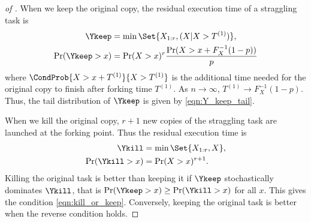 \begin{proof}[of ]
When we keep the original copy, the residual execution time of a straggling task is \begin{align}
\Ykeep &= \min\Set{X_{1:r}, (X | X > T^{(1)})}, \\
\Pr(\Ykeep > x) &= \Pr(X>x)^r \frac{\Pr(X > x + F_X^{-1}(1-p))}{p} \label{eqn:Y_keep_tail}
\end{align}
where $\CondProb{X > x + T^{(1)}}{X > T^{(1)}}$ is the additional time needed for the original copy to finish after forking time $T^{(1)}$. As $n \rightarrow \infty$, $T^{(1)} \rightarrow F_X^{-1}(1-p)$. Thus, the tail distribution of $\Ykeep$ is given by \eqref{eqn:Y_keep_tail}. 

When we kill the original copy, $r+1$ new copies of the straggling task are launched at the forking point. Thus the residual execution time is
\begin{align}
\Ykill &= \min\Set{X_{1:r}, X}, \\
\Pr(\Ykill > x) &= \Pr(X>x)^{r+1}.
\end{align}
Killing the original task is better than keeping it if $\Ykeep$ stochastically dominates $\Ykill$, that is $\Pr(\Ykeep > x) \geq \Pr(\Ykill > x)$ for all $x$. This gives the condition \eqref{eqn:kill_or_keep}. Conversely, keeping the original task is better when the reverse condition holds.
\end{proof}

